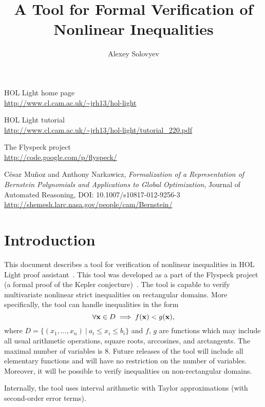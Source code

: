 \documentclass[a4paper]{article}
\title{A Tool for Formal Verification of Nonlinear Inequalities}
\author{Alexey Solovyev}
\begin{document}
\maketitle

\tableofcontents

\pagebreak
\begin{thebibliography}{9}
 HOL Light home page\\ 
	\url{http://www.cl.cam.ac.uk/~jrh13/hol-light}

 HOL Light tutorial\\
	\url{http://www.cl.cam.ac.uk/~jrh13/hol-light/tutorial_220.pdf}

 The Flyspeck project\\
	\url{http://code.google.com/p/flyspeck/}

C\'esar Mu\~noz and Anthony Narkawicz, {\it Formalization of a Representation of Bernstein Polynomials and Applications to Global Optimization}, Journal of Automated Reasoning, DOI: 10.1007/s10817-012-9256-3\\
	\url{http://shemesh.larc.nasa.gov/people/cam/Bernstein/}
\end{thebibliography}

\section{Introduction}
This document describes a tool for verification of nonlinear inequalities in HOL Light proof assistant~\cite{HOL, HOL-tutorial}. This tool was developed as a part of the Flyspeck project (a formal proof of the Kepler conjecture)~\cite{flyspeck}. The tool is capable to verify multivariate nonlinear strict inequalities on rectangular domains. More specifically, the tool can handle inequalities in the form
\[\forall {\bf x} \in D \implies f({\bf x}) < g({\bf x}),\]
where $D = \{(x_1, \ldots, x_n)\ |\ a_i \le x_i \le b_i\}$ and $f$, $g$ are functions which may include all usual arithmetic operations, square roots, arccosines, and arctangents. The maximal number of variables is 8. Future releases of the tool will include all elementary functions and will have no restriction on the number of variables. Moreover, it will be possible to verify inequalities on non-rectangular domains.

Internally, the tool uses interval arithmetic with Taylor approximations (with second-order error terms).
\end{document}
